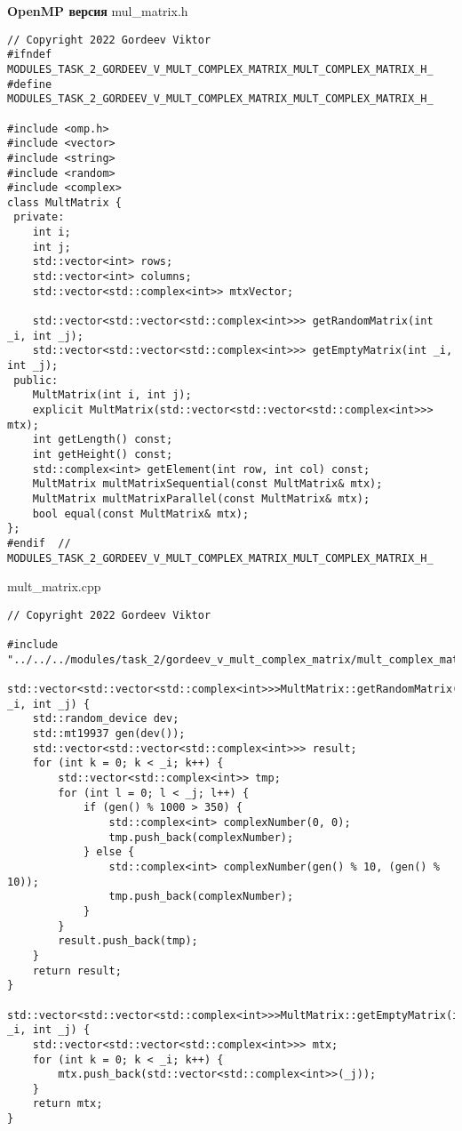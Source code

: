 \documentclass{report}
\begin{document}
\begin{enumerate}
\begin{lstlisting}
\end{lstlisting}

\textbf{OpenMP версия}
\newline
\newline mul_matrix.h
\begin{lstlisting}
// Copyright 2022 Gordeev Viktor
#ifndef MODULES_TASK_2_GORDEEV_V_MULT_COMPLEX_MATRIX_MULT_COMPLEX_MATRIX_H_
#define MODULES_TASK_2_GORDEEV_V_MULT_COMPLEX_MATRIX_MULT_COMPLEX_MATRIX_H_

#include <omp.h>
#include <vector>
#include <string>
#include <random>
#include <complex>
class MultMatrix {
 private:
    int i;
    int j;
    std::vector<int> rows;
    std::vector<int> columns;
    std::vector<std::complex<int>> mtxVector;

    std::vector<std::vector<std::complex<int>>> getRandomMatrix(int _i, int _j);
    std::vector<std::vector<std::complex<int>>> getEmptyMatrix(int _i, int _j);
 public:
    MultMatrix(int i, int j);
    explicit MultMatrix(std::vector<std::vector<std::complex<int>>> mtx);
    int getLength() const;
    int getHeight() const;
    std::complex<int> getElement(int row, int col) const;
    MultMatrix multMatrixSequential(const MultMatrix& mtx);
    MultMatrix multMatrixParallel(const MultMatrix& mtx);
    bool equal(const MultMatrix& mtx);
};
#endif  // MODULES_TASK_2_GORDEEV_V_MULT_COMPLEX_MATRIX_MULT_COMPLEX_MATRIX_H_

\end{lstlisting}
mult_matrix.cpp
\begin{lstlisting}
// Copyright 2022 Gordeev Viktor

#include "../../../modules/task_2/gordeev_v_mult_complex_matrix/mult_complex_matrix.h"

std::vector<std::vector<std::complex<int>>>MultMatrix::getRandomMatrix(int _i, int _j) {
    std::random_device dev;
    std::mt19937 gen(dev());
    std::vector<std::vector<std::complex<int>>> result;
    for (int k = 0; k < _i; k++) {
        std::vector<std::complex<int>> tmp;
        for (int l = 0; l < _j; l++) {
            if (gen() % 1000 > 350) {
                std::complex<int> complexNumber(0, 0);
                tmp.push_back(complexNumber);
            } else {
                std::complex<int> complexNumber(gen() % 10, (gen() % 10));
                tmp.push_back(complexNumber);
            }
        }
        result.push_back(tmp);
    }
    return result;
}

std::vector<std::vector<std::complex<int>>>MultMatrix::getEmptyMatrix(int _i, int _j) {
    std::vector<std::vector<std::complex<int>>> mtx;
    for (int k = 0; k < _i; k++) {
        mtx.push_back(std::vector<std::complex<int>>(_j));
    }
    return mtx;
}


\end{lstlisting}
\end{enumerate}
\end{document}
